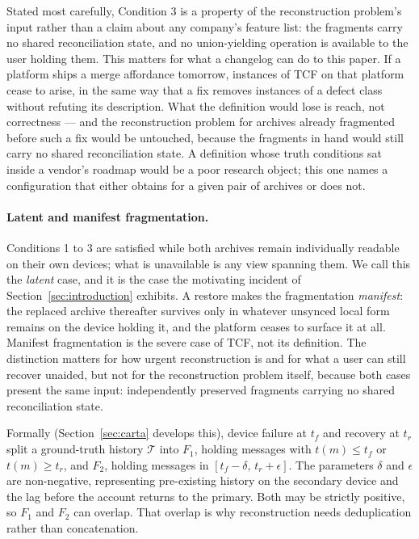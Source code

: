 Stated most carefully, Condition 3 is a property of the reconstruction problem's
input rather than a claim about any company's feature list: the fragments carry
no shared reconciliation state, and no union-yielding operation is available to
the user holding them. This matters for what a changelog can do to this paper. If
a platform ships a merge affordance tomorrow, instances of TCF on that platform
cease to arise, in the same way that a fix removes instances of a defect class
without refuting its description. What the definition would lose is reach, not
correctness --- and the reconstruction problem for archives already fragmented
before such a fix would be untouched, because the fragments in hand would still
carry no shared reconciliation state. A definition whose truth conditions sat
inside a vendor's roadmap would be a poor research object; this one names a
configuration that either obtains for a given pair of archives or does not.

\paragraph{Latent and manifest fragmentation.} Conditions 1 to 3 are satisfied
while both archives remain individually readable on their own devices; what is
unavailable is any view spanning them. We call this the \emph{latent} case,
and it is the case the motivating incident of Section~\ref{sec:introduction}
exhibits. A restore makes the fragmentation \emph{manifest}: the replaced
archive thereafter survives only in whatever unsynced local form remains on
the device holding it, and the platform ceases to surface it at all. Manifest
fragmentation is the severe case of TCF, not its definition. The distinction
matters for how urgent reconstruction is and for what a user can still recover
unaided, but not for the reconstruction problem itself, because both cases
present the same input: independently preserved fragments carrying no shared
reconciliation state.

Formally (Section~\ref{sec:carta} develops this), device failure at $t_f$ and
recovery at $t_r$ split a ground-truth history $\mathcal{T}$ into $F_1$,
holding messages with $t(m) \le t_f$ or $t(m) \ge t_r$, and $F_2$, holding
messages in $[t_f - \delta,\, t_r + \epsilon]$. The parameters $\delta$ and
$\epsilon$ are non-negative, representing pre-existing history on the
secondary device and the lag before the account returns to the primary. Both
may be strictly positive, so $F_1$ and $F_2$ can overlap. That overlap is why
reconstruction needs deduplication rather than concatenation.

